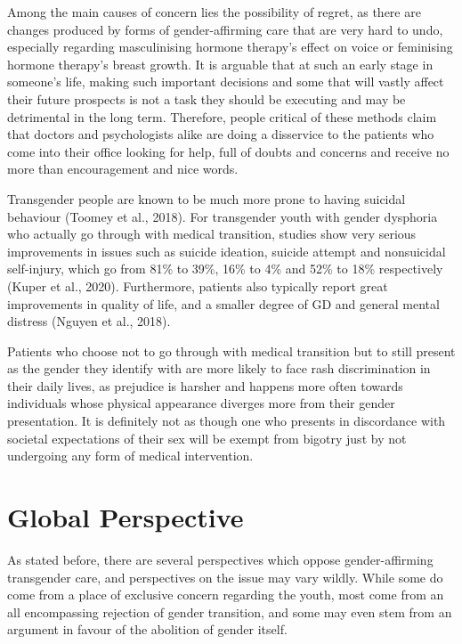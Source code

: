 \documentclass{article}
\begin{document}
Among the main causes of concern lies the possibility of regret, as there are changes produced by forms of gender-affirming care that are very hard to undo, especially regarding masculinising hormone therapy’s effect on voice or feminising hormone therapy’s breast growth. It is arguable that at such an early stage in someone's life, making such important decisions and some that will vastly affect their future prospects is not a task they should be executing and may be detrimental in the long term. Therefore, people critical of these methods claim that doctors and psychologists alike are doing a disservice to the patients who come into their office looking for help, full of doubts and concerns and receive no more than encouragement and nice words.\par

Transgender people are known to be much more prone to having suicidal behaviour (Toomey et al., 2018). For transgender youth with gender dysphoria who actually go through with medical transition, studies show very serious improvements in issues such as suicide ideation, suicide attempt and nonsuicidal self-injury, which go from 81\% to 39\%, 16\% to 4\% and 52\% to 18\% respectively (Kuper et al., 2020). Furthermore, patients also typically report great improvements in quality of life, and a smaller degree of GD and general mental distress (Nguyen et al., 2018).\par

Patients who choose not to go through with medical transition but to still present as the gender they identify with are more likely to face rash discrimination in their daily lives, as prejudice is harsher and happens more often towards individuals whose physical appearance diverges more from their gender presentation. It is definitely not as though one who presents in discordance with societal expectations of their sex will be exempt from bigotry just by not undergoing any form of medical intervention.

\section{Global Perspective}

As stated before, there are several perspectives which oppose gender-affirming transgender care, and perspectives on the issue may vary wildly. While some do come from a place of exclusive concern regarding the youth, most come from an all encompassing rejection of gender transition, and some may even stem from an argument in favour of the abolition of gender itself.\par
\end{document}
